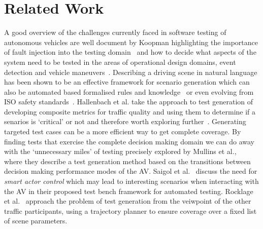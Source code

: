 \documentclass[letterpaper, 10 pt, journal, twoside]{IEEEtran}
\begin{document}



\section{Related Work}

A good overview of the challenges currently faced in software testing of autonomous vehicles are well document by Koopman highlighting the importance of fault injection into the testing domain~\cite{Koopman2016} and how to decide what aspects of the system need to be tested in the areas of operational design domains, event detection and vehicle maneuvers~\cite{Koopman2019}. 
%
Describing a driving scene in natural language has been shown to be an effective framework for scenario generation which can also be automated based formalised rules and knowledge~\cite{Bagschik2018} or even evolving from ISO safety standards~\cite{Menzel2018}. 
%
Hallenbach et al. take the approach to test generation of developing composite metrics for traffic quality and using them to determine if a senarios is `critical' or not and therefore worth exploring further~\cite{Hallerbach2018}. 
%
Generating targeted test cases can be a more efficient way to get complete coverage. By finding tests that exercise the complete decision making domain we can do away with the `unnecessary miles' of testing precisely explored by Mullins et al.,~\cite{Mullins2018} where they describe a test generation method based on the transitions between decision making performance modes of the AV. 
%
Saigol et al.~\cite{Saigol2018} discuss the need for \textit{smart actor control} which may lead to interesting scenarios when interacting with the AV in their proposed test bench framework for automated testing. 
%
Rocklage et al.~\cite{Rocklage2017} approach the problem of test generation from the veiwpoint of the other traffic participants, using a trajectory planner to ensure coverage over a fixed list of scene parameters.

\end{document}
